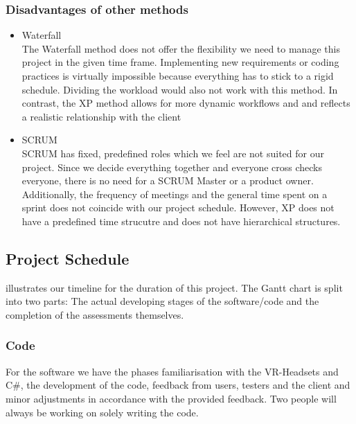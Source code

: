 \documentclass[coverpage,lineno]{../custom}
\begin{document}
\subsubsection{Disadvantages of other methods}
\begin{itemize}
    \item Waterfall \\
    The Waterfall method does not offer the flexibility we need to manage this project in the given time frame. Implementing new requirements or coding practices is virtually impossible because everything has to stick to a rigid schedule. Dividing the workload would also not work with this method. In contrast, the XP method allows for more dynamic workflows and and reflects a realistic relationship with the client
    \item SCRUM \\
    SCRUM has fixed, predefined roles which we feel are not suited for our project. Since we decide everything together and everyone cross checks everyone, there is no need for a SCRUM Master or a product owner. Additionally, the frequency of meetings and the general time spent on a sprint does not coincide with our project schedule. However, XP does not have a predefined time strucutre and does not have hierarchical structures.   
    
    
\end{itemize}

\subsection{Project Schedule}
\label{ssec:schedule}

 illustrates our timeline for the duration of this project. The Gantt chart is split into two parts: The actual developing stages of the software/code and the completion of the assessments themselves. 
\subsubsection{Code}
For the software we have the phases familiarisation with the VR-Headsets and C\#, the development of the code, feedback from users, testers and the client and minor adjustments in accordance with the provided feedback. Two people will always be working on solely writing the code. 
\end{document}
